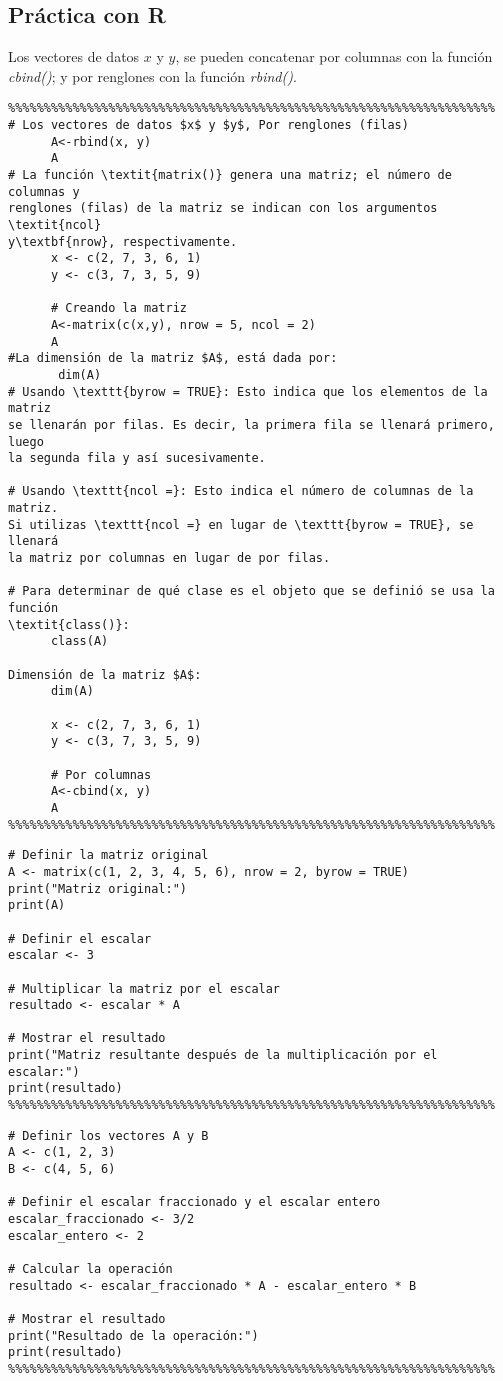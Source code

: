 \subsection{Práctica con R}
Los vectores de datos $x$ y $y$, se pueden concatenar por columnas con la función  \textit{cbind()}; y  por renglones con
la función \textit{rbind()}.
\begin{verbatim}
%%%%%%%%%%%%%%%%%%%%%%%%%%%%%%%%%%%%%%%%%%%%%%%%%%%%%%%%%%%%%%%%%%%%
# Los vectores de datos $x$ y $y$, Por renglones (filas)
      A<-rbind(x, y)
      A
# La función \textit{matrix()} genera una matriz; el número de columnas y 
renglones (filas) de la matriz se indican con los argumentos \textit{ncol}
y\textbf{nrow}, respectivamente.
      x <- c(2, 7, 3, 6, 1)
      y <- c(3, 7, 3, 5, 9)

      # Creando la matriz
      A<-matrix(c(x,y), nrow = 5, ncol = 2)
      A
#La dimensión de la matriz $A$, está dada por:
       dim(A)
# Usando \texttt{byrow = TRUE}: Esto indica que los elementos de la matriz 
se llenarán por filas. Es decir, la primera fila se llenará primero, luego
la segunda fila y así sucesivamente.

# Usando \texttt{ncol =}: Esto indica el número de columnas de la matriz. 
Si utilizas \texttt{ncol =} en lugar de \texttt{byrow = TRUE}, se llenará 
la matriz por columnas en lugar de por filas.

# Para determinar de qué clase es el objeto que se definió se usa la función
\textit{class()}:
      class(A)

Dimensión de la matriz $A$: 
      dim(A) 

      x <- c(2, 7, 3, 6, 1)
      y <- c(3, 7, 3, 5, 9)

      # Por columnas
      A<-cbind(x, y)
      A
%%%%%%%%%%%%%%%%%%%%%%%%%%%%%%%%%%%%%%%%%%%%%%%%%%%%%%%%%%%%%%%%%%%%
\end{verbatim}
\begin{verbatim}
# Definir la matriz original
A <- matrix(c(1, 2, 3, 4, 5, 6), nrow = 2, byrow = TRUE)
print("Matriz original:")
print(A)

# Definir el escalar
escalar <- 3

# Multiplicar la matriz por el escalar
resultado <- escalar * A

# Mostrar el resultado
print("Matriz resultante después de la multiplicación por el escalar:")
print(resultado)
%%%%%%%%%%%%%%%%%%%%%%%%%%%%%%%%%%%%%%%%%%%%%%%%%%%%%%%%%%%%%%%%%%%%
\end{verbatim}
\begin{verbatim}
# Definir los vectores A y B
A <- c(1, 2, 3)
B <- c(4, 5, 6)

# Definir el escalar fraccionado y el escalar entero
escalar_fraccionado <- 3/2
escalar_entero <- 2

# Calcular la operación
resultado <- escalar_fraccionado * A - escalar_entero * B

# Mostrar el resultado
print("Resultado de la operación:")
print(resultado)
%%%%%%%%%%%%%%%%%%%%%%%%%%%%%%%%%%%%%%%%%%%%%%%%%%%%%%%%%%%%%%%%%%%%    
\end{verbatim}
